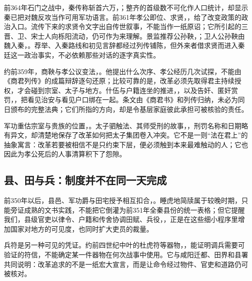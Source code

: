 前364年石门之战中，秦传称斩首六万，；整齐的首级数不可化作人口统计，却显示秦已把对魏反攻当作可用军功语言。前361年孝公即位、求贤，，给了改变政策的政治入口。流传下来的求贤令文字出自传世叙事，不能当作一纸原诏；它所引起的三晋、卫、宋士人向栎阳流动，仍可作为来理解。景监推荐公孙鞅，；卫人公孙鞅由魏入秦，。荐举、入秦路线和初见言辞都经过列传铺陈，但外来者借求贤而进入秦廷这一政治事实，不必依赖那些对话的逐字真实性。

约前359年，商鞅与孝公议变法，。他提出什么次序、孝公经历几次试探，不能由《商君列传》的成篇辩辞逐句还原；比较可靠的是，改革必须先取得君主持续授权，才会碰到宗室、太子与地方。什伍与户籍连坐的推进，，以及告奸、匿奸赏罚，，把看见治安与看见户口绑在一起。条文由《商君书》和列传归纳，未必为同日颁布的完整法典；它们所指的方向，却是令基层家庭彼此承担可被核验的责任。

军功重估宗室与贵族的位置，。太子驷触法、其师受刑的故事，，刑罚名称和日期略有异文，却清楚地保存了改革如何把太子集团卷入冲突。它不是一则“法在君上”的抽象寓言：改革若要被相信不是只约束下层，便必须触到本来最难触动的人；它也因此为孝公死后的人事清算积下了怨隙。

\subsection{县、田与兵：制度并不在同一天完成}

前350年以后，县邑、军功爵与田宅授予相互扣合，。睡虎地简牍属于较晚时期，只能旁证成熟的文书实践，不能把它倒灌为前351年全秦县份的统一表格；但它提醒我们，县级官吏以律令、户籍和传舍协调田赋、兵役，，正是在这些细小程序里增加国家对地方的可见度，也同时扩大吏员的裁量。

兵符是另一种可见的凭证。约前四世纪中叶的杜虎符等器物，，能证明调兵需要可验证的符信，不能确定某一件器物在何次战事中使用。它与咸阳迁都、田界和县署共同说明：改革追求的不是一纸宏大宣言，而是让命令经过物件、官吏和道路仍可被核对。

